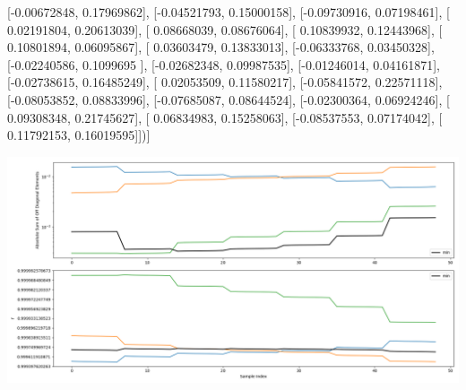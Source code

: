 \documentclass{article}
\begin{document}
       [-0.00672848,  0.17969862],
       [-0.04521793,  0.15000158],
       [-0.09730916,  0.07198461],
       [ 0.02191804,  0.20613039],
       [ 0.08668039,  0.08676064],
       [ 0.10839932,  0.12443968],
       [ 0.10801894,  0.06095867],
       [ 0.03603479,  0.13833013],
       [-0.06333768,  0.03450328],
       [-0.02240586,  0.1099695 ],
       [-0.02682348,  0.09987535],
       [-0.01246014,  0.04161871],
       [-0.02738615,  0.16485249],
       [ 0.02053509,  0.11580217],
       [-0.05841572,  0.22571118],
       [-0.08053852,  0.08833996],
       [-0.07685087,  0.08644524],
       [-0.02300364,  0.06924246],
       [ 0.09308348,  0.21745627],
       [ 0.06834983,  0.15258063],
       [-0.08537553,  0.07174042],
       [ 0.11792153,  0.16019595]])]
\begin{center}
\includegraphics[scale=.9]{report_pickled_controls141/control_dpn_all.png}

\end{center}
\end{document}
